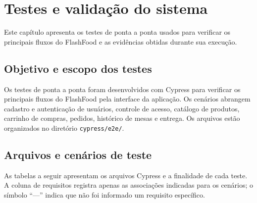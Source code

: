 ﻿%
\chapter[Testes e validação do sistema]{Testes e validação do sistema}
\label{chap:testes}

Este capítulo apresenta os testes de ponta a ponta usados para verificar os principais fluxos do FlashFood e as evidências obtidas durante sua execução.

\section{Objetivo e escopo dos testes}

Os testes de ponta a ponta foram desenvolvidos com Cypress para verificar os principais fluxos do FlashFood pela interface da aplicação. Os cenários abrangem cadastro e autenticação de usuários, controle de acesso, catálogo de produtos, carrinho de compras, pedidos, histórico de mesas e entrega. Os arquivos estão organizados no diretório \texttt{cypress/e2e/}.

\section{Arquivos e cenários de teste}

As tabelas a seguir apresentam os arquivos Cypress e a finalidade de cada teste. A coluna de requisitos registra apenas as associações indicadas para os cenários; o símbolo “—” indica que não foi informado um requisito específico.

\Needspace{0.8\textheight}


